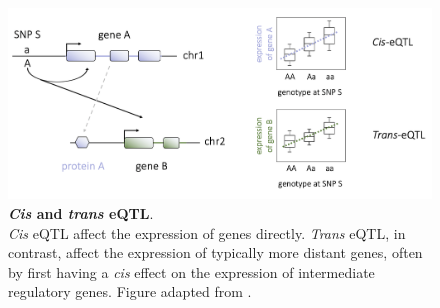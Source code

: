 
\begin{figure}[h]
\centering
\includegraphics[width=15cm]{Chapter1/Fig/eqtl.png}
\caption[\textit{Cis} and \textit{trans} eQTL]{\textbf{\textit{Cis} and \textit{trans} eQTL}.\\
\textit{Cis} eQTL affect the expression of genes directly. 
\textit{Trans} eQTL, in contrast, affect the expression of typically more distant genes, often by first having a \textit{cis} effect on the expression of intermediate regulatory genes.
Figure adapted from \cite{westra2014genome}.
}
\label{fig:eqtl}
\end{figure}




